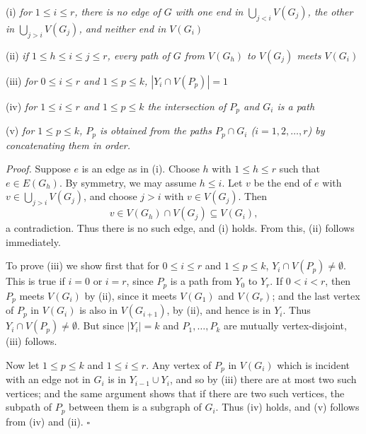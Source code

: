 \hspace*{12pt}(i) \textit{for $1 \le i \le r$, there is no edge of $G$ with one end in $\bigcup_{j < i} V(G_j)$, the other in $\bigcup_{j > i} V(G_j)$, and neither end in $V(G_i)$}

\hspace*{12pt}(ii) \textit{if $1 \le h \le i \le j \le r$, every path of $G$ from $V(G_h)$ to $V(G_j)$ meets $V(G_i)$}

\hspace*{12pt}(iii) \textit{for $0 \le i \le r$ and $1 \le p \le k$, $|Y_i \cap V(P_p)| = 1$}

\hspace*{12pt}(iv) \textit{for $1 \le i \le r$ and $1 \le p \le k$ the intersection of $P_p$ and $G_i$ is a path}

\hspace*{12pt}(v) \textit{for $1 \le p \le k$, $P_p$ is obtained from the paths $P_p \cap G_i$ ($i = 1, 2, \dots, r$) by concatenating them in order.}

\textit{Proof.} Suppose $e$ is an edge as in (i). Choose $h$ with $1 \le h \le r$ such that $e \in E(G_h)$. By symmetry, we may assume $h \le i$. Let $v$ be the end of $e$ with $v \in \bigcup_{j > i} V(G_j)$, and choose $j > i$ with $v \in V(G_j)$. Then
\begin{equation*}
v \in V(G_h) \cap V(G_j) \subseteq V(G_i),
\end{equation*}
a contradiction. Thus there is no such edge, and (i) holds. From this, (ii) follows immediately.

To prove (iii) we show first that for $0 \le i \le r$ and $1 \le p \le k$, $Y_i \cap V(P_p) \ne \emptyset$. This is true if $i = 0$ or $i = r$, since $P_p$ is a path from $Y_0$ to $Y_r$. If $0 < i < r$, then $P_p$ meets $V(G_i)$ by (ii), since it meets $V(G_1)$ and $V(G_r)$; and the last vertex of $P_p$ in $V(G_i)$ is also in $V(G_{i+1})$, by (ii), and hence is in $Y_i$. Thus $Y_i \cap V(P_p) \ne \emptyset$. But since $|Y_i| = k$ and $P_1, \dots, P_k$ are mutually vertex-disjoint, (iii) follows.

Now let $1 \le p \le k$ and $1 \le i \le r$. Any vertex of $P_p$ in $V(G_i)$ which is incident with an edge not in $G_i$ is in $Y_{i-1} \cup Y_i$, and so by (iii) there are at most two such vertices; and the same argument shows that if there are two such vertices, the subpath of $P_p$ between them is a subgraph of $G_i$. Thus (iv) holds, and (v) follows from (iv) and (ii). $\square$


